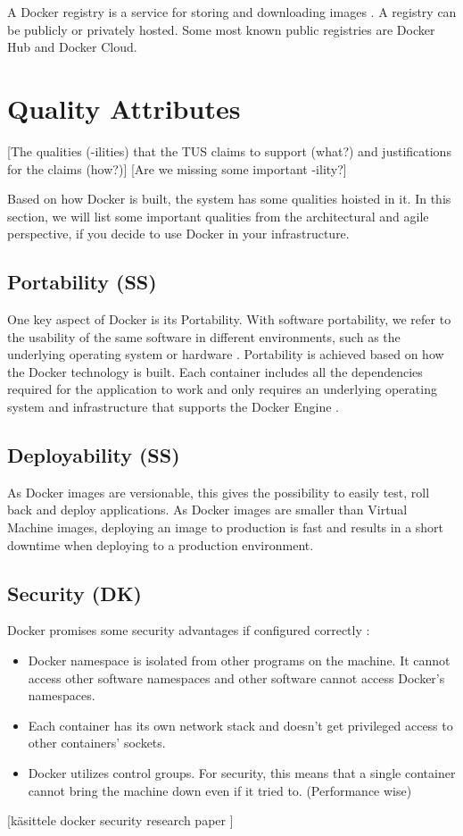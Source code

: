 \documentclass[fleqn,12pt]{olplainarticle}
\begin{document}
A Docker registry is a service for storing and downloading images \citep{aquasec:docker_architecture}. A registry can be publicly or privately hosted. Some most known public registries are Docker Hub and Docker Cloud.

\section{Quality Attributes}

[The qualities (-ilities) that the TUS claims to support (what?) and justifications for the claims (how?)]
[Are we missing some important -ility?]

Based on how Docker is built, the system has some qualities hoisted in it. In this section, we will list some important qualities from the architectural and agile perspective, if you decide to use Docker in your infrastructure. 

\subsection{Portability (SS)}
One key aspect of Docker is its Portability. With software portability, we refer to the usability of the same software in different environments, such as the underlying operating system or hardware \citep{wiki:Software_portability}. Portability is achieved based on how the Docker technology is built. Each container includes all the dependencies required for the application to work and only requires an underlying operating system and infrastructure that supports the Docker Engine \citep{hy:DevOps_with_Docker}.

\subsection{Deployability (SS)}
As Docker images are versionable, this gives the possibility to easily test, roll back and deploy applications\citep{hentsu:benefits}. As Docker images are smaller than Virtual Machine images, deploying an image to production is fast and results in a short downtime when deploying to a production environment. 

\subsection{Security (DK)}
Docker promises some security advantages if configured correctly \citep{docker:security}:
\begin{itemize}
    \item  Docker namespace is isolated from other programs on the machine. It cannot access other software namespaces and other software cannot access Docker's namespaces. 
    \item Each container has its own network stack and doesn't get privileged access to other containers' sockets.
    \item Docker utilizes control groups. For security, this means that a single container cannot bring the machine down even if it tried to. (Performance wise)
    
\end{itemize}
[käsittele docker security research paper \citep{docker_security_paper}]
\end{document}
